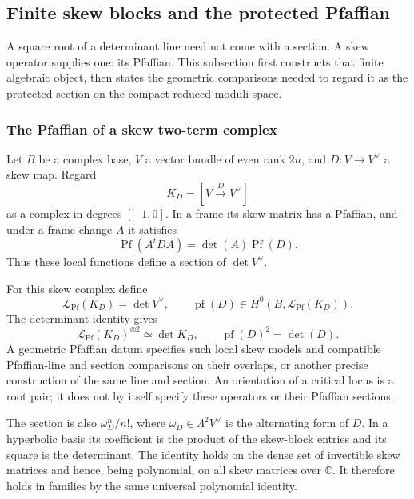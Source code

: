 \subsection{Finite skew blocks and the protected Pfaffian}
\label{subsec:dirac-pfaffian}

A square root of a determinant line need not come with a section.
A skew operator supplies one: its Pfaffian.  This subsection first
constructs that finite algebraic object, then states the geometric
comparisons needed to regard it as the protected section on the
compact reduced moduli space.

\subsubsection*{The Pfaffian of a skew two-term complex}

Let \(B\) be a complex base, \(V\) a vector bundle of even rank
\(2n\), and \(D:V\to V^\vee\) a skew map.  Regard
\[
 K_D=[V\xrightarrow{D}V^\vee]
\]
as a complex in degrees \([-1,0]\).  In a frame its skew matrix has
a Pfaffian, and under a frame change \(A\) it satisfies
\[
 \operatorname{Pf}(A^tDA)=\det(A)\operatorname{Pf}(D).
\]
Thus these local functions define a section of \(\det V^\vee\).

\begin{definition}
\label{def:pfaffian-line}
For this skew complex define
\[
 \mathscr L_{\mathrm{Pf}}(K_D)=\det V^\vee,
 \qquad \operatorname{pf}(D)\in
 H^0(B,\mathscr L_{\mathrm{Pf}}(K_D)).
\]
The determinant identity gives
\[
 \mathscr L_{\mathrm{Pf}}(K_D)^{\otimes2}
 \simeq\det K_D,
 \qquad \operatorname{pf}(D)^2=\det(D).
\]
A geometric Pfaffian datum specifies such local skew models and
compatible Pfaffian-line and section comparisons on their overlaps,
or another precise construction of the same line and section.
An orientation of a critical locus is a root pair; it does not by
itself specify these operators or their Pfaffian sections.
\end{definition}

The section is also \(\omega_D^n/n!\), where
\(\omega_D\in\Lambda^2V^\vee\) is the alternating form of \(D\).
In a hyperbolic basis its coefficient is the product of the skew-block
entries and its square is the determinant.  The identity holds on the
dense set of invertible skew matrices and hence, being polynomial, on
all skew matrices over \(\mathbb C\).  It therefore holds in families
by the same universal polynomial identity.


